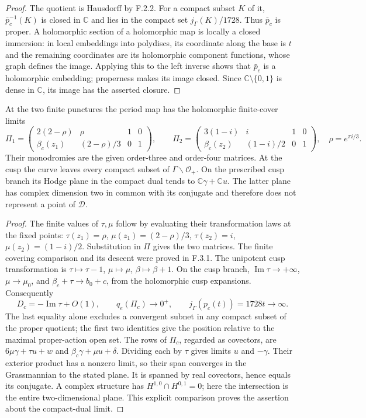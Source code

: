 \begin{proof}
The quotient is Hausdorff by F.2.2.  For a compact subset $K$ of it,
$\bar p_c^{-1}(K)$ is closed in $\mathbb C$ and lies in the compact set
$j_\Gamma(K)/1728$.  Thus $\bar p_c$ is proper.  A holomorphic section of
a holomorphic map is locally a closed immersion: in local embeddings
into polydiscs, its coordinate along the base is $t$ and the remaining
coordinates are its holomorphic component functions, whose graph
defines the image.  Applying this to the left inverse shows that
$\bar p_c$ is a holomorphic embedding; properness makes its image
closed.  Since $\mathbb C\setminus\{0,1\}$ is dense in $\mathbb C$, its
image has the asserted closure.
\end{proof}

\begin{proposition}[F.3.2; Proved]\label{st:F.3.2}
At the two finite punctures the period map has the holomorphic
finite-cover limits
\[
 \Pi_1=
 \begin{pmatrix}2(2-\rho)&\rho&1&0\\
 \beta_c(z_1)&(2-\rho)/3&0&1\end{pmatrix},\qquad
 \Pi_2=
 \begin{pmatrix}3(1-i)&i&1&0\\
 \beta_c(z_2)&(1-i)/2&0&1\end{pmatrix},
 \quad \rho=e^{\pi i/3}.
\]
Their monodromies are the given order-three and order-four matrices.
At the cusp the curve leaves every compact subset of
$\Gamma\backslash\mathcal O_+$.  On the prescribed cusp branch its
Hodge plane in the compact dual tends to
$\mathbb C\gamma+\mathbb Cu$.  The latter plane has complex dimension
two in common with its conjugate and therefore does not represent a
point of $\mathcal D$.
\end{proposition}

\begin{proof}
The finite values of $\tau,\mu$ follow by evaluating their transformation
laws at the fixed points: $\tau(z_1)=\rho$,
$\mu(z_1)=(2-\rho)/3$, $\tau(z_2)=i$,
$\mu(z_2)=(1-i)/2$.  Substitution in $\Pi$ gives the two matrices.
The finite covering comparison and its descent were proved in F.3.1.
The unipotent cusp transformation is
$\tau\mapsto\tau-1$, $\mu\mapsto\mu$, $\beta\mapsto\beta+1$.
On the cusp branch, $\operatorname{Im}\tau\to+\infty$,
$\mu\to\mu_0$, and $\beta_c+\tau\to b_0+c$, from the holomorphic
cusp expansions.  Consequently
\[
 D_c=-\operatorname{Im}\tau+O(1),\qquad
 q_e(\Pi_c)\longrightarrow0^+,
 \qquad j_\Gamma(p_c(t))=1728t\longrightarrow\infty.
\]
The last equality alone excludes a convergent subnet in any compact
subset of the proper quotient; the first two identities give the
position relative to the maximal proper-action open set.
The rows of $\Pi_c$, regarded as covectors, are
$6\mu\gamma+\tau u+w$ and $\beta_c\gamma+\mu u+\delta$.
Dividing each by $\tau$ gives limits $u$ and $-\gamma$.
Their exterior product has a nonzero limit, so their span converges
in the Grassmannian to the stated plane.  It is spanned by real
covectors, hence equals its conjugate.  A complex structure has
$H^{1,0}\cap H^{0,1}=0$; here the intersection is the entire
two-dimensional plane.  This explicit comparison proves the assertion
about the compact-dual limit.
\end{proof}

